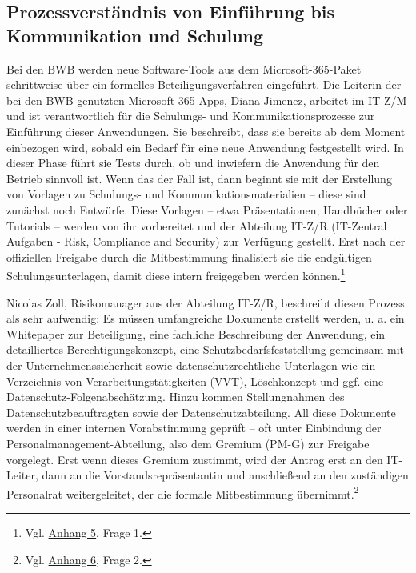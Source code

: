 \documentclass[
    12pt, 
    a4paper,
    ]{scrartcl} %
\begin{document}
\subsection{Prozessverständnis von Einführung bis Kommunikation und Schulung}
Bei den BWB werden neue Software-Tools aus dem Microsoft-365-Paket schrittweise über ein formelles Beteiligungsverfahren eingeführt. Die Leiterin der bei den BWB genutzten Microsoft-365-Apps, Diana Jimenez, arbeitet im IT-Z/M und ist verantwortlich für die Schulungs- und Kommunikationsprozesse zur Einführung dieser Anwendungen. Sie beschreibt, dass sie bereits ab dem Moment einbezogen wird, sobald ein Bedarf für eine neue Anwendung festgestellt wird. In dieser Phase führt sie Tests durch, ob und inwiefern die Anwendung für den Betrieb sinnvoll ist. Wenn das der Fall ist, dann beginnt sie mit der Erstellung von Vorlagen zu Schulungs- und Kommunikationsmaterialien – diese sind zunächst noch Entwürfe. Diese Vorlagen – etwa Präsentationen, Handbücher oder Tutorials – werden von ihr vorbereitet und der Abteilung IT-Z/R (IT-Zentral Aufgaben - Risk, Compliance and Security) zur Verfügung gestellt. Erst nach der offiziellen Freigabe durch die Mitbestimmung finalisiert sie die endgültigen Schulungsunterlagen, damit diese intern freigegeben werden können.\footnote{Vgl. \hyperref[sec:Anhang5]{Anhang 5}, Frage 1.}

Nicolas Zoll, Risikomanager aus der Abteilung IT-Z/R, beschreibt diesen Prozess als sehr aufwendig: Es müssen umfangreiche Dokumente erstellt werden, u. a. ein Whitepaper zur Beteiligung, eine fachliche Beschreibung der Anwendung, ein detailliertes Berechtigungskonzept, eine Schutzbedarfsfeststellung gemeinsam mit der Unternehmenssicherheit sowie datenschutzrechtliche Unterlagen wie ein Verzeichnis von Verarbeitungstätigkeiten (VVT), Löschkonzept und ggf. eine Datenschutz-Folgenabschätzung. Hinzu kommen Stellungnahmen des Datenschutzbeauftragten sowie der Datenschutzabteilung. All diese Dokumente werden in einer internen Vorabstimmung geprüft – oft unter Einbindung der Personalmanagement-Abteilung, also dem Gremium (PM-G) zur Freigabe vorgelegt. Erst wenn dieses Gremium zustimmt, wird der Antrag erst an den IT-Leiter, dann an die Vorstandsrepräsentantin und anschließend an den zuständigen Personalrat weitergeleitet, der die formale Mitbestimmung übernimmt.\footnote{Vgl. \hyperref[sec:Anhang6]{Anhang 6}, Frage 2.}
\end{document}
